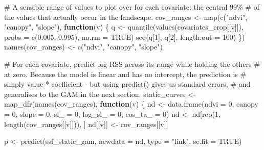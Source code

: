 \documentclass[
  letterpaper,
  DIV=11,
  numbers=noendperiod]{scrartcl}
\newenvironment{Shaded}{\begin{snugshade}}{\end{snugshade}}
\newcommand{\AttributeTok}[1]{\textcolor[rgb]{0.40,0.45,0.13}{#1}}
\newcommand{\CommentTok}[1]{\textcolor[rgb]{0.37,0.37,0.37}{#1}}
\newcommand{\ConstantTok}[1]{\textcolor[rgb]{0.56,0.35,0.01}{#1}}
\newcommand{\ControlFlowTok}[1]{\textcolor[rgb]{0.00,0.23,0.31}{\textbf{#1}}}
\newcommand{\DecValTok}[1]{\textcolor[rgb]{0.68,0.00,0.00}{#1}}
\newcommand{\FloatTok}[1]{\textcolor[rgb]{0.68,0.00,0.00}{#1}}
\newcommand{\FunctionTok}[1]{\textcolor[rgb]{0.28,0.35,0.67}{#1}}
\newcommand{\NormalTok}[1]{\textcolor[rgb]{0.00,0.23,0.31}{#1}}
\newcommand{\OtherTok}[1]{\textcolor[rgb]{0.00,0.23,0.31}{#1}}
\newcommand{\StringTok}[1]{\textcolor[rgb]{0.13,0.47,0.30}{#1}}
\begin{document}
\begin{Shaded}
\begin{Highlighting}[]
\CommentTok{\# A sensible range of values to plot over for each covariate: the central 99\%}
\CommentTok{\# of the values that actually occur in the landscape.}
\NormalTok{cov\_ranges }\OtherTok{\textless{}{-}} \FunctionTok{map}\NormalTok{(}\FunctionTok{c}\NormalTok{(}\StringTok{"ndvi"}\NormalTok{, }\StringTok{"canopy"}\NormalTok{, }\StringTok{"slope"}\NormalTok{), }\ControlFlowTok{function}\NormalTok{(v) \{}
\NormalTok{  q }\OtherTok{\textless{}{-}} \FunctionTok{quantile}\NormalTok{(}\FunctionTok{values}\NormalTok{(covariates\_crop[[v]]), }\AttributeTok{probs =} \FunctionTok{c}\NormalTok{(}\FloatTok{0.005}\NormalTok{, }\FloatTok{0.995}\NormalTok{), }\AttributeTok{na.rm =} \ConstantTok{TRUE}\NormalTok{)}
  \FunctionTok{seq}\NormalTok{(q[}\DecValTok{1}\NormalTok{], q[}\DecValTok{2}\NormalTok{], }\AttributeTok{length.out =} \DecValTok{100}\NormalTok{)}
\NormalTok{\})}
\FunctionTok{names}\NormalTok{(cov\_ranges) }\OtherTok{\textless{}{-}} \FunctionTok{c}\NormalTok{(}\StringTok{"ndvi"}\NormalTok{, }\StringTok{"canopy"}\NormalTok{, }\StringTok{"slope"}\NormalTok{)}

\CommentTok{\# For each covariate, predict log{-}RSS across its range while holding the others}
\CommentTok{\# at zero. Because the model is linear and has no intercept, the prediction is}
\CommentTok{\# simply value * coefficient {-} but using predict() gives us standard errors,}
\CommentTok{\# and generalises to the GAM in the next section.}
\NormalTok{static\_curves }\OtherTok{\textless{}{-}} \FunctionTok{map\_dfr}\NormalTok{(}\FunctionTok{names}\NormalTok{(cov\_ranges), }\ControlFlowTok{function}\NormalTok{(v) \{}
\NormalTok{  nd }\OtherTok{\textless{}{-}} \FunctionTok{data.frame}\NormalTok{(}\AttributeTok{ndvi =} \DecValTok{0}\NormalTok{, }\AttributeTok{canopy =} \DecValTok{0}\NormalTok{, }\AttributeTok{slope =} \DecValTok{0}\NormalTok{,}
                   \AttributeTok{sl\_ =} \DecValTok{0}\NormalTok{, }\AttributeTok{log\_sl\_ =} \DecValTok{0}\NormalTok{, }\AttributeTok{cos\_ta\_ =} \DecValTok{0}\NormalTok{)}
\NormalTok{  nd }\OtherTok{\textless{}{-}}\NormalTok{ nd[}\FunctionTok{rep}\NormalTok{(}\DecValTok{1}\NormalTok{, }\FunctionTok{length}\NormalTok{(cov\_ranges[[v]])), ]}
\NormalTok{  nd[[v]] }\OtherTok{\textless{}{-}}\NormalTok{ cov\_ranges[[v]]}

\NormalTok{  p }\OtherTok{\textless{}{-}} \FunctionTok{predict}\NormalTok{(ssf\_static\_gam, }\AttributeTok{newdata =}\NormalTok{ nd, }\AttributeTok{type =} \StringTok{"link"}\NormalTok{, }\AttributeTok{se.fit =} \ConstantTok{TRUE}\NormalTok{)}


\end{Highlighting}
\end{Shaded}
\end{document}
